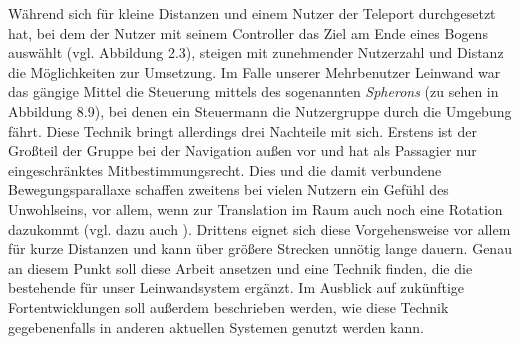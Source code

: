 Während sich für kleine Distanzen und einem Nutzer der Teleport durchgesetzt hat, bei dem der Nutzer mit seinem Controller das Ziel am Ende eines Bogens auswählt (vgl. Abbildung 2.3), steigen mit zunehmender Nutzerzahl und Distanz die Möglichkeiten zur Umsetzung.
Im Falle unserer Mehrbenutzer Leinwand war das gängige Mittel die Steuerung mittels des sogenannten \textit{Spherons} (zu sehen in Abbildung 8.9), bei denen ein Steuermann die Nutzergruppe durch die Umgebung \glqq fährt\grqq{}.
Diese Technik bringt allerdings drei Nachteile mit sich. Erstens ist der Großteil der Gruppe bei der Navigation außen vor und hat als Passagier nur eingeschränktes Mitbestimmungsrecht. Dies und die damit verbundene Bewegungsparallaxe schaffen zweitens bei vielen Nutzern ein Gefühl des Unwohlseins, vor allem, wenn zur Translation im Raum auch noch eine Rotation dazukommt (vgl. dazu auch \cite{WeisskerMulti-RayReality}). Drittens eignet sich diese Vorgehensweise vor allem für kurze Distanzen und kann über größere Strecken unnötig lange dauern.
Genau an diesem Punkt soll diese Arbeit ansetzen und eine Technik finden, die die bestehende für unser Leinwandsystem ergänzt. Im Ausblick auf zukünftige Fortentwicklungen soll außerdem beschrieben werden, wie diese Technik gegebenenfalls in anderen aktuellen Systemen genutzt werden kann.